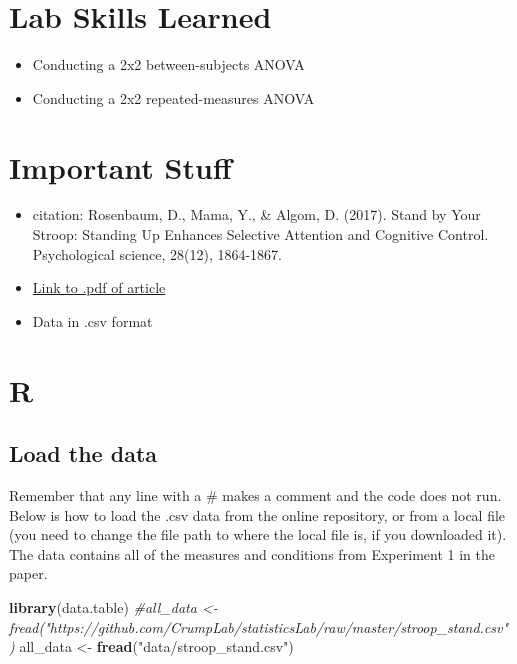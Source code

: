 \documentclass[]{book}
\newenvironment{Shaded}{\begin{snugshade}}{\end{snugshade}}
\newcommand{\KeywordTok}[1]{\textcolor[rgb]{0.13,0.29,0.53}{\textbf{#1}}}
\newcommand{\StringTok}[1]{\textcolor[rgb]{0.31,0.60,0.02}{#1}}
\newcommand{\CommentTok}[1]{\textcolor[rgb]{0.56,0.35,0.01}{\textit{#1}}}
\newcommand{\NormalTok}[1]{#1}
\providecommand{\tightlist}{%
  \setlength{\itemsep}{0pt}\setlength{\parskip}{0pt}}
\begin{document}
\section{Lab Skills Learned}\label{lab-skills-learned-4}

\begin{itemize}
\tightlist
\item
  Conducting a 2x2 between-subjects ANOVA
\item
  Conducting a 2x2 repeated-measures ANOVA
\end{itemize}

\section{Important Stuff}\label{important-stuff-4}

\begin{itemize}
\tightlist
\item
  citation: Rosenbaum, D., Mama, Y., \& Algom, D. (2017). Stand by Your
  Stroop: Standing Up Enhances Selective Attention and Cognitive
  Control. Psychological science, 28(12), 1864-1867.
\item
  \href{https://www.researchgate.net/profile/David_Rosenbaum6/publication/320070495_Stand_by_Your_Stroop_Standing_Up_Enhances_Selective_Attention_and_Cognitive_Control/links/5a82b4f10f7e9bda869fac5b/Stand-by-Your-Stroop-Standing-Up-Enhances-Selective-Attention-and-Cognitive-Control.pdf}{Link
  to .pdf of article}
\item
  Data in .csv format
\end{itemize}

\section{R}\label{r-10}

\subsection{Load the data}\label{load-the-data-4}

Remember that any line with a \# makes a comment and the code does not
run. Below is how to load the .csv data from the online repository, or
from a local file (you need to change the file path to where the local
file is, if you downloaded it). The data contains all of the measures
and conditions from Experiment 1 in the paper.

\begin{Shaded}
\begin{Highlighting}[]
\KeywordTok{library}\NormalTok{(data.table)}
\CommentTok{#all_data <- fread("https://github.com/CrumpLab/statisticsLab/raw/master/stroop_stand.csv")}
\NormalTok{all_data <-}\StringTok{ }\KeywordTok{fread}\NormalTok{(}\StringTok{"data/stroop_stand.csv"}\NormalTok{)}
\end{Highlighting}
\end{Shaded}
\end{document}
